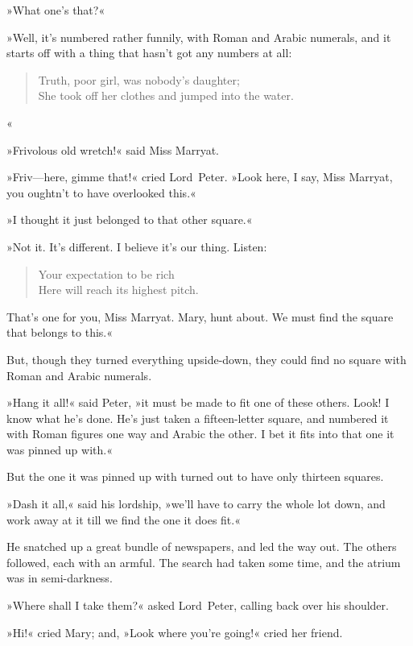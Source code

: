 »What one's that?«

»Well, it's numbered rather funnily, with Roman and Arabic numerals, and it starts off with a thing that hasn't got any numbers at all:

\begin{verse}
Truth, poor girl, was nobody's daughter;\\
She took off her clothes and jumped into the water.\\
\end{verse}
«

»Frivolous old wretch!« said Miss Marryat.

»Friv—here, gimme that!« cried Lord~Peter. »Look here, I say, Miss Marryat, you oughtn't to have overlooked this.«

»I thought it just belonged to that other square.«

»Not it. It's different. I believe it's our thing. Listen:

\begin{verse}
Your expectation to be rich\\
Here will reach its highest pitch.\\
\end{verse}

That's one for you, Miss Marryat. Mary, hunt about. We must find the square that belongs to this.«

But, though they turned everything upside-down, they could find no square with Roman and Arabic numerals.

»Hang it all!« said Peter, »it must be made to fit one of these others. Look! I know what he's done. He's just taken a fifteen-letter square, and numbered it with Roman figures one way and Arabic the other. I bet it fits into that one it was pinned up with.«

But the one it was pinned up with turned out to have only thirteen squares.

»Dash it all,« said his lordship, »we'll have to carry the whole lot down, and work away at it till we find the one it does fit.«

He snatched up a great bundle of newspapers, and led the way out. The others followed, each with an armful. The search had taken some time, and the atrium was in semi-darkness.

»Where shall I take them?« asked Lord~Peter, calling back over his shoulder.

»Hi!« cried Mary; and, »Look where you're going!« cried her friend.

